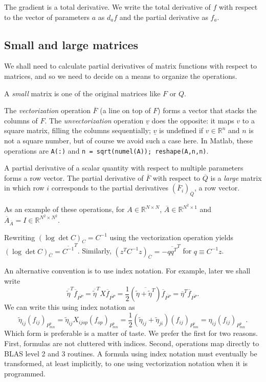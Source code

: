 \documentclass[10pt,fleqn]{article}
\renewcommand{\vec}[1]{\ensuremath{\overline{#1}}}
\newcommand{\unvec}[1]{\ensuremath{\underline{#1}}}
\begin{document}
The gradient is a total derivative. We write the total derivative of $f$ with
respect to the vector of parameters $a$ as $d_a f$ and the partial derivative as
$f_a$.

\subsection{Small and large matrices}
We shall need to calculate partial derivatives of matrix functions with respect
to matrices, and so we need to decide on a means to organize the operations.

A \emph{small} matrix is one of the original matrices like $F$ or $Q$.

The \emph{vectorization} operation $\vec F$ (a line on top of $F$) forms a
vector that stacks the columns of $F$. The \emph{unvectorization} operation
$\unvec v$ does the opposite: it maps $v$ to a square matrix, filling the
columns sequentially; $\unvec{v}$ is undefined if $v \in \mathbb{R}^n$ and $n$
is not a square number, but of course we avoid such a case here. In {\sc
  Matlab}, these operations are {\tt A(:)} and {\tt n = sqrt(numel(A));
  reshape(A,n,n)}.

A partial derivative of a scalar quantity with respect to multiple parameters
forms a row vector. The partial derivative of $\vec F$ with respect to $\vec Q$
is a \emph{large} matrix in which row $i$ corresponds to the partial derivatives
$(\vec F_i)_{\vec Q}$, a row vector.

As an example of these operations, for $A \in \mathbb{R}^{N \times N}$, $\vec A
\in \mathbb{R}^{N^2 \times 1}$ and $\vec A_{\vec A} = I \in \mathbb{R}^{N^2
  \times N^2}$.

Rewriting $(\log \det C)_C = C^{-1}$ using the vectorization operation yields
$(\log \det C)_{\vec C} = \vec{C^{-1}}^T$. Similarly, $(z^T C^{-1} z)_{\vec C} =
-\vec{q q^T}^T$ for $q \equiv C^{-1} z$.

An alternative convention is to use index notation. For example, later we
shall write
\[\vec{\tilde\eta}^T \vec f_{\vec{P^P}} = \vec{\tilde\eta}^T X \vec f_{\vec{P^P}} =
\frac{1}{2}(\vec{\tilde\eta + \tilde\eta^T}) \vec f_{\vec{P^P}} = \vec\eta^T
\vec f_{\vec{P^P}}.\] We can write this using index notation
as \[\tilde\eta_{ij} (f_{ij})_{P^p_{mn}} = \tilde\eta_{ij} X_{ijop}
(f_{op})_{P^p_{mn}} = \frac{1}{2}(\tilde\eta_{ij} + \tilde\eta_{ji})
(f_{ij})_{P^p_{mn}} = \eta_{ij} (f_{ij})_{P^p_{mn}}.\] Which form is preferable
is a matter of taste. We prefer the first for two reasons. First, formulas are
not cluttered with indices. Second, operations map directly to BLAS level 2 and
3 routines. A formula using index notation must eventually be transformed, at
least implicitly, to one using vectorization notation when it is programmed.
\end{document}
